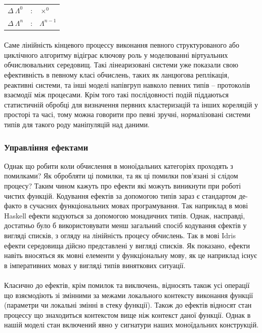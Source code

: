 \documentclass[11pt,oneside]{article}
\begin{document}
\begin{center}
\begin{tabular}{lcl}
$\Delta \ \Lambda^0$         &:& $\times^0$ \\
$\Delta \ \Lambda^{n}$       &:& $\Lambda^{n-1}$ \\
\end{tabular}
\end{center}

   \paragraph{}
   Саме лінійність кінцевого
   процессу виконання певного структурованого або циклічного алгоритму відіграє ключову
   роль у моделюванні віртуальних обчислювальних середовищ. Такі лінеаризовані системи
   уже показали свою ефективність в певному класі обчислень, таких як ланцюгова реплікація,
   реактивні системи, та інші моделі напівгруп навколо певних типів -- протоколів взаємодії між процесами.
   Крім того такі послідовності подій піддаються статистичній обробці для визначення первних кластеризацій
   та інших кореляцій у просторі та часі, тому можна говорити про певні зручні, нормалізовані системи типів для
   такого роду маніпуляцій над даними.

  \subsubsection{Управління ефектами}
   Однак що робити коли обчислення в моноїдальних категоріях проходять з помилками?
   Як обробляти ці помилки, та як ці помилки пов’язані зі слідом процесу? Таким чином кажуть
   про ефекти які можуть виникнути при роботі чистих функцій.
   Кодування ефектів за допомогою типів зараз є стандартом
   де-факто в сучасних функціональних мовах програмування. Так наприклад в мові Haskell ефекти кодуються
   за допомогою монадичних типів. Однак, насправді, достатньо було б використовувати менш загальний спосіб
   кодування єфектів у вигляді списків, з огляду на лінійність процесу обчислень. Так в мові Idris
   ефекти середовища дійсно представлені у вигляді списків. Як показано\cite{baer}, ефекти
   навіть вносяться як мовні елементи у функціональну мову, як це наприклад існує
   в імперативних мовах у вигляді типів виняткових ситуації.

   \paragraph{}
   Класично до ефектів, крім помилок та виключень, відносять також усі
   операції що взяємодіють зі змінними за межами локального контексту
   виконання функції (параметри чи локальні змінні в стеку функції).
   Також до ефектів відносят стан процессу що знаходиться контекстом
   вище ніж контекст даної функції. Однак в нашій моделі стан включений
   явно у сигнатури наших моноїдальних конструкцій.
\end{document}
